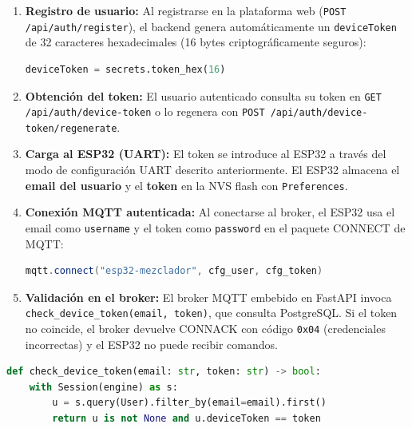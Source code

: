 \documentclass[conference]{IEEEtran}
\begin{document}
\begin{enumerate}
    \item \textbf{Registro de usuario:} Al registrarse en la plataforma web (\texttt{POST /api/auth/register}), el backend genera autom\'aticamente un \texttt{deviceToken} de 32 caracteres hexadecimales (16 bytes criptogr\'aficamente seguros):
    \begin{lstlisting}[language=Python, caption={Generaci\'on del token en el backend}]
deviceToken = secrets.token_hex(16)
    \end{lstlisting}

    \item \textbf{Obtenci\'on del token:} El usuario autenticado consulta su token en \texttt{GET /api/auth/device-token} o lo regenera con \texttt{POST /api/auth/device-token/regenerate}.

    \item \textbf{Carga al ESP32 (UART):} El token se introduce al ESP32 a trav\'es del modo de configuraci\'on UART descrito anteriormente. El ESP32 almacena el \textbf{email del usuario} y el \textbf{token} en la NVS flash con \texttt{Preferences}.

    \item \textbf{Conexi\'on MQTT autenticada:} Al conectarse al broker, el ESP32 usa el email como \texttt{username} y el token como \texttt{password} en el paquete CONNECT de MQTT:
    \begin{lstlisting}[language=C++, caption={Conexi\'on MQTT con credenciales de dispositivo}]
mqtt.connect("esp32-mezclador", cfg_user, cfg_token)
    \end{lstlisting}

    \item \textbf{Validaci\'on en el broker:} El broker MQTT embebido en FastAPI invoca \texttt{check\_device\_token(email, token)}, que consulta PostgreSQL. Si el token no coincide, el broker devuelve CONNACK con c\'odigo \texttt{0x04} (credenciales incorrectas) y el ESP32 no puede recibir comandos.
\end{enumerate}

\begin{lstlisting}[language=Python, caption={Validaci\'on del token de dispositivo en el servidor}]
def check_device_token(email: str, token: str) -> bool:
    with Session(engine) as s:
        u = s.query(User).filter_by(email=email).first()
        return u is not None and u.deviceToken == token
\end{lstlisting}
\end{document}
